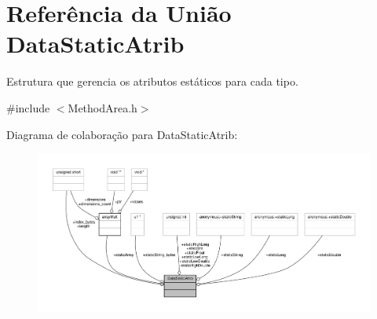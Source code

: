 \hypertarget{unionDataStaticAtrib}{}\section{Referência da União Data\+Static\+Atrib}
\label{unionDataStaticAtrib}


Estrutura que gerencia os atributos estáticos para cada tipo.  




{\ttfamily \#include $<$Method\+Area.\+h$>$}



Diagrama de colaboração para Data\+Static\+Atrib\+:\nopagebreak
\begin{figure}[H]
\begin{center}
\leavevmode
\includegraphics[width=350pt]{unionDataStaticAtrib__coll__graph}
\end{center}
\end{figure}
